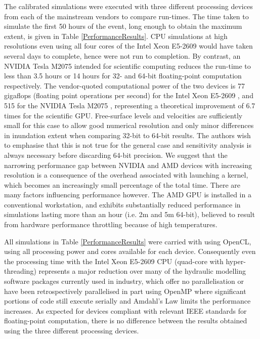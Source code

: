 \documentclass[11pt,english,a4paper]{article}
\begin{document}
The calibrated simulations were executed with three different processing devices from each of the mainstream vendors to compare run-times. The time taken to simulate the first 50 hours of the event, long enough to obtain the maximum extent, is given in Table \ref{PerformanceResults}. CPU simulations at high resolutions even using all four cores of the Intel Xeon E5-2609 would have taken several days to complete, hence were not run to completion. By contrast, an NVIDIA Tesla M2075 intended for scientific computing reduces the run-time to less than 3.5 hours or 14 hours for 32- and 64-bit floating-point computation respectively. The vendor-quoted computational power of the two devices is 77 gigaflops (floating point operations per second) for the Intel Xeon E5-2609 \citep{IntelCorporation2012}, and 515 for the NVIDIA Tesla M2075 \citep{NVIDIACorporation2011}, representing a theoretical improvement of 6.7 times for the scientific GPU. Free-surface levels and velocities are sufficiently small for this case to allow good numerical resolution and only minor differences in inundation extent when comparing 32-bit to 64-bit results. The authors wish to emphasise that this is not true for the general case and sensitivity analysis is always necessary before discarding 64-bit precision. We suggest that the narrowing performance gap between NVIDIA and AMD devices with increasing resolution is a consequence of the overhead associated with launching a kernel, which becomes an increasingly small percentage of the total time. There are many factors influencing performance however. The AMD GPU is installed in a conventional workstation, and exhibits substantially reduced performance in simulations lasting more than an hour (i.e. 2m and 5m 64-bit), believed to result from hardware performance throttling because of high temperatures.

All simulations in Table \ref{PerformanceResults} were carried with using OpenCL, using all processing power and cores available for each device. Consequently even the processing time with the Intel Xeon E5-2609 CPU (quad-core with hyper-threading) represents a major reduction over many of the hydraulic modelling software packages currently used in industry, which offer no parallelisation or have been retrospectively parallelised in part using OpenMP \citep{Pender2010,Pender2013} where significant portions of code still execute serially and Amdahl's Law limits the performance increases. As expected for devices compliant with relevant IEEE standards for floating-point computation, there is no difference between the results obtained using the three different processing devices. 
\end{document}
